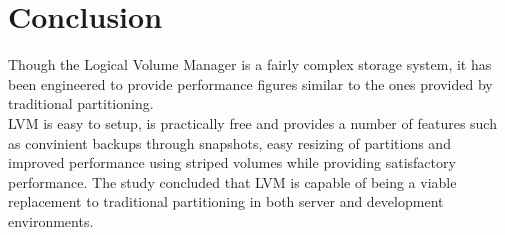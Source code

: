 \chapter{Conclusion}
Though the Logical Volume Manager is a fairly complex storage system, it has
been engineered to provide performance figures similar to the ones provided by
traditional partitioning.\\

LVM is easy to setup, is practically free and provides a number of features such
as convinient backups through snapshots, easy resizing of partitions and
improved performance using striped volumes while providing satisfactory
performance. The study concluded that LVM is capable of being a viable
replacement to traditional partitioning in both server and development
environments.
